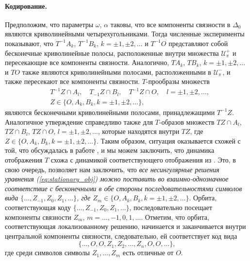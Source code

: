 \paragraph{Кодирование.}
Предположим, что параметры $\omega$, $\alpha$ таковы, что все компоненты связности в $\Delta_0$ являются криволинейными четырехугольниками.
Тогда численные эксперименты показывают, что $T^{-1} A_k$, $T^{-1} B_k$, $k = \pm 1, \pm 2, \dots$ и $T^{-1} O$ представляют собой бесконечные криволинейные полосы, расположенные внутри множества $\mathcal{U}_{\pi}^+$ и пересекающие все компоненты связности.
Аналогично, $TA_k$, $TB_k$, $k = \pm 1, \pm 2, \dots$ и $TO$ также являются криволинейными полосами, расположенными в $\mathcal{U}_{\pi}^-$, и также пересекают все компоненты связности.
$T$-прообразы множеств
%
\begin{eqnarray*}
& T^{-1} Z \cap A_l, \quad T_{-1} Z \cap B_l, \quad T^{-1} Z \cap O, \quad l = \pm 1, \pm 2, \dots, \\
& Z \in \{ O, A_k, B_k, k = \pm 1, \pm 2, \dots \},
\end{eqnarray*}
%
являются бесконечными криволинейными полосами, принадлежащими $T^{-1} Z$.
Аналогичное утверждение справедливо также для $T$-образов множеств $TZ \cap A_l$, $TZ \cap B_l$, $TZ \cap O$, $l = \pm 1, \pm 2, \dots$, которые находятся внутри $TZ$, где $Z \in \{ O, A_k, B_k, k = \pm 1, \pm 2, \dots \}$.
Таким образом, ситуация оказывается схожей с той, что обсуждалась в работе \cite{AlfAvr}, и мы можем заключить, что динамика отображения $T$ схожа с динамикой соответствующего отображения из \cite{AlfAvr}.
Это, в свою очередь, позволяет нам заключить, что {\it все несингулярные решения уравнения (\ref{eq:stationary_obj}) можно поставить во взаимно-однозначное соответствие с бесконечными в обе стороны последовательностями символов вида $\{ \dots, Z_{-1}, Z_0, Z_1, \dots \}$, где $Z_m \in \{ O, A_k, B_k, k = \pm 1, \pm 2, \dots \}$}.
Орбита, соответствующая коду $\{ \dots, Z_{-1}, Z_0, Z_1 ,\dots\}$, последовательно посещает компоненты связности $Z_m$, $m = \dots, -1, 0, 1, \dots$.
Отметим, что орбита, соответствующая локализованному решению, начинается и заканчивается внутри центральной компоненты связности, следовательно, ей соответствует код вида
%
\begin{equation*}
\{ \dots, O, O, Z_1, Z_2, \dots, Z_n, O, O, \dots \},
\end{equation*}
%
где среди символов символы $Z_1, \dots, Z_m$ есть отличные от $O$.

